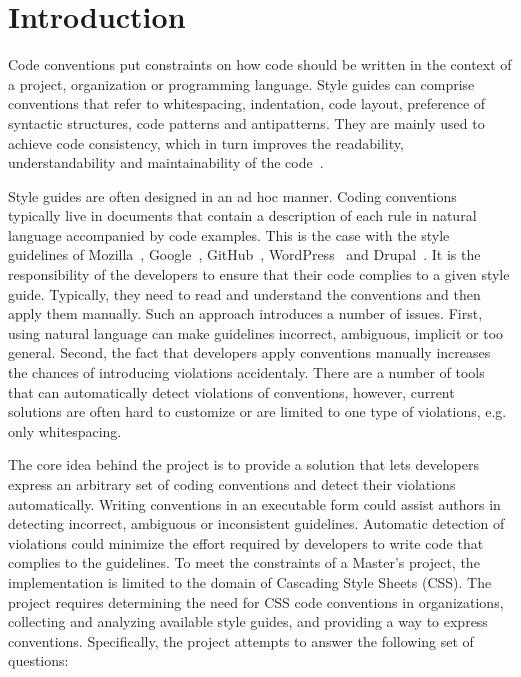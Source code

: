 \chapter{Introduction}

Code conventions put constraints on how code should be written in the context
of a project, organization or programming language. Style guides can comprise
conventions that refer to whitespacing, indentation, code layout, preference
of syntactic structures, code patterns and antipatterns. They are mainly used
to achieve code consistency, which in turn improves the readability,
understandability and maintainability of the
code~\cite{Buse2010,tenny1988program,smit2011code}.

Style guides are often designed in an ad hoc manner. Coding conventions typically live in documents
that contain a description of each rule in natural language accompanied by code examples. This is
the case with the style guidelines of Mozilla~\cite{Mozilla}, Google~\cite{Google},
GitHub~\cite{GitHub}, WordPress~\cite{Wordpress} and Drupal~\cite{Drupal}. It is the responsibility
of the developers to ensure that their code complies to a given style guide. Typically, they need to
read and understand the conventions and then apply them manually. Such an approach introduces a
number of issues. First, using natural language can make guidelines incorrect, ambiguous, implicit
or too general. Second, the fact that developers apply conventions manually increases the chances of
introducing violations accidentaly. There are a number of tools that can automatically detect
violations of conventions, however, current solutions are often hard to customize or are limited to
one type of violations, e.g. only whitespacing.

The core idea behind the project is to provide a solution that lets developers express an arbitrary
set of coding conventions and detect their violations automatically. Writing conventions
in an executable form could assist authors in detecting incorrect, ambiguous or inconsistent
guidelines. Automatic detection of violations could minimize the effort required by developers to
write code that complies to the guidelines. To meet the constraints of a Master’s project, the
implementation is limited to the domain of Cascading Style Sheets (CSS). The project requires
determining the need for CSS code conventions in organizations, collecting and analyzing available
style guides, and providing a way to express conventions. Specifically, the project attempts to
answer the following set of questions:

